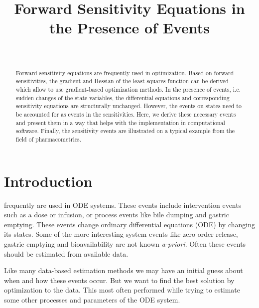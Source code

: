 \documentclass[journal, a4paper]{IEEEtran}
\begin{document}
	\title{Forward Sensitivity Equations in the Presence of Events}

\author{
    \\
}


	\maketitle

\begin{abstract}
	Forward sensitivity equations are frequently used in optimization. Based on forward sensitivities, the gradient and Hessian of the least squares function can be derived which allow to use gradient-based optimization methods. In the presence of events, i.e. sudden changes of the state variables, the differential equations and corresponding sensitivity equations are structurally unchanged. However, the events on states need to be accounted for as events in the sensitivities. Here, we derive these necessary events and present them in a way that helps with the implementation in computational software. Finally, the sensitivity events are illustrated on a typical example from the field of pharmacometrics.
\end{abstract}

\section{Introduction}
	 frequently are used in ODE systems.  These
	events include intervention events such as a dose
	or infusion, or process events like bile
	dumping and gastric emptying.  These events change ordinary
	differential equations (ODE) by changing its states.  Some of
	the more interesting system events like zero order release, gastric
	emptying and bioavailability are not known \emph{a-priori}.  Often these
	events should be estimated from available data.

	Like many data-based estimation methods we may have an initial guess about
	when and how these events occur.  But we want to find the best solution
	by optimization to the data. This most often performed while trying to
	estimate some other processes and parameters of the ODE system.
\end{document}

